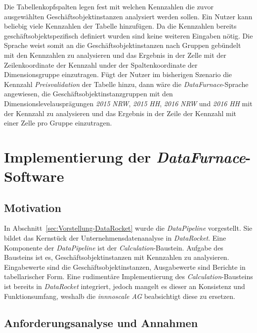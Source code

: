 \documentclass[
  language=german, %
  type=bachelor%
]{isthesis}
\begin{document}
\begin{content}
  Die Tabellenkopfspalten legen fest mit welchen Kennzahlen die zuvor
  ausgewählten Geschäftsobjektinstanzen analysiert werden sollen. Ein Nutzer
  kann beliebig viele Kennzahlen der Tabelle hinzufügen. Da die
  Kennzahlen bereits geschäftsobjektspezifisch definiert wurden sind keine
  weiteren Eingaben nötig. Die Sprache weist somit an die
  Geschäftsobjektinstanzen nach Gruppen gebündelt mit den Kennzahlen zu
  analysieren und das Ergebnis in der Zelle mit der Zeilenkoordinate der
  Kennzahl under der Spaltenkoordinate der Dimensionsgruppe einzutragen. Fügt
  der Nutzer im bisherigen Szenario die Kennzahl \textit{Preisvalidation} der
  Tabelle hinzu, dann wäre die \textit{DataFurnace}-Sprache angewiesen,
  die Geschäftsobjektinstanzgruppen mit den Dimensionslevelausprägungen
  \textit{2015} \textit{NRW}, \textit{2015} \textit{HH}, \textit{2016}
  \textit{NRW} und \textit{2016} \textit{HH} mit der Kennzahl zu analysieren
  und das Ergebnis in der Zeile der Kennzahl mit einer Zelle pro Gruppe
  einzutragen.



  \chapter{Implementierung der \textit{DataFurnace}-Software}

  \section{Motivation}
  In Abschnitt~\ref{sec:Vorstellung-DataRocket} wurde die \textit{DataPipeline}
  vorgestellt. Sie bildet das Kernstück der Unternehmensdatenanalyse in
  \textit{DataRocket}. Eine Komponente der \textit{DataPipeline} ist der
  \textit{Calculation}-Baustein.  Aufgabe des Bausteins ist es,
  Geschäftsobjektinstanzen mit Kennzahlen zu analysieren. Eingabewerte sind die
  Geschäftsobjektinstanzen, Ausgabewerte sind Berichte in tabellarischer Form.
  Eine rudimentäre Implementierung des \textit{Calculation}-Bausteins ist
  bereits in \textit{DataRocket} integriert, jedoch mangelt es dieser an
  Konsistenz und Funktionsumfang, weshalb die \textit{innnoscale AG}
  beabsichtigt diese zu ersetzen.

  \section{Anforderungsanalyse und Annahmen}\label{sec:software/anforderungsanalyse}


\end{content}
\end{document}
